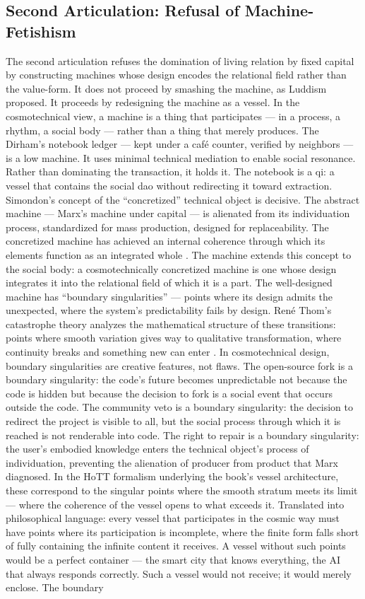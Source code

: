 \subsection{Second Articulation: Refusal of Machine-Fetishism}

The second articulation refuses the domination of living relation by fixed capital by constructing machines whose design encodes the relational field rather than the value-form. It does not proceed by smashing the machine, as Luddism proposed. It proceeds by redesigning the machine as a vessel. In the cosmotechnical view, a machine is a thing that participates — in a process, a rhythm, a social body — rather than a thing that merely produces. The Dirham’s notebook ledger — kept under a café counter, verified by neighbors — is a low machine. It uses minimal technical mediation to enable social resonance. Rather than dominating the transaction, it holds it. The notebook is a qi: a vessel that contains the social dao without redirecting it toward extraction. Simondon’s concept of the “concretized” technical object is decisive. The abstract machine — Marx’s machine under capital — is alienated from its individuation process, standardized for mass production, designed for replaceability. The concretized machine has achieved an internal coherence through which its elements function as an integrated whole \cite[pp.~51-- 78]{simondon_2017}. The  machine extends this concept to the social body: a cosmotechnically concretized machine is one whose design integrates it into the relational field of which it is a part. The well-designed machine has “boundary singularities” — points where its design admits the unexpected, where the system’s predictability fails by design. René Thom’s catastrophe theory analyzes the mathematical structure of these transitions: points where smooth variation gives way to qualitative transformation, where continuity breaks and something new can enter \cite{thom_1975}. In cosmotechnical design, boundary singularities are creative features, not flaws. The open-source fork is a boundary singularity: the code’s future becomes unpredictable not because the code is hidden but because the decision to fork is a social event that occurs outside the code. The community veto is a boundary singularity: the decision to redirect the project is visible to all, but the social process through which it is reached is not renderable into code. The right to repair is a boundary singularity: the user’s embodied knowledge enters the technical object’s process of individuation, preventing the alienation of producer from product that Marx diagnosed. In the HoTT formalism underlying the book’s vessel architecture, these correspond to the singular points where the smooth stratum meets its limit — where the coherence of the vessel opens to what exceeds it. Translated into philosophical language: every vessel that participates in the cosmic way must have points where its participation is incomplete, where the finite form falls short of fully containing the infinite content it receives. A vessel without such points would be a perfect container — the smart city that knows everything, the AI that always responds correctly. Such a vessel would not receive; it would merely enclose. The boundary 